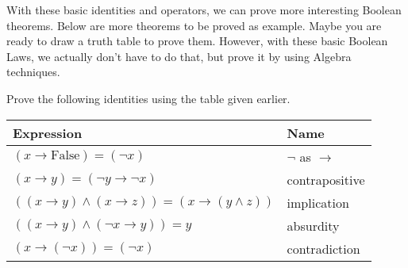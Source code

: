         With these basic identities and operators, we can prove more interesting Boolean theorems.
        Below are more theorems to be proved as example. Maybe you are ready to draw a truth table to prove
        them. However, with these basic Boolean Laws, we actually don't have to do that, but prove it
        by using Algebra techniques.
        \begin{example}
            Prove the following identities using the table given earlier.
        \begin{table}[ht]
            \centering
            \begin{tabular}{ll}
            \toprule
            \textbf{Expression} & \textbf{Name} \\
            \midrule
            \( (x \rightarrow \text{False}) = (\lnot x) \) & $\lnot$ as \(\rightarrow\) \\
            \( (x \rightarrow y) = (\lnot y \rightarrow \lnot x) \) & contrapositive \\
            \( ((x \rightarrow y) \land (x \rightarrow z)) = (x \rightarrow (y \land z)) \) & implication \\
            \( ((x \rightarrow y) \land (\lnot x \rightarrow y)) = y \) & absurdity \\
            \( (x \rightarrow (\lnot x)) = (\lnot x) \) & contradiction \\
            \bottomrule
            \end{tabular}
        \end{table}
        \end{example}

